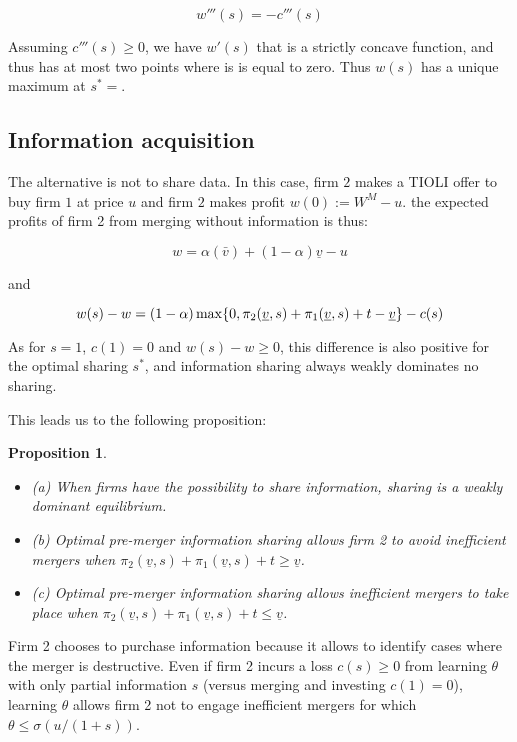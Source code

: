 \documentclass[a4paper,leqno]{article}%
\newtheorem{prop}{Proposition}
\renewcommand{\t}{\theta}
\renewcommand{\a}{\alpha}
\newcommand{\s}{\sigma}
\newcommand{\uv}{\underline v}
\newcommand{\ov}{\bar v}
\begin{document}
\[
w'''(s)=-c'''(s)
\]

Assuming $c'''(s)\geq 0$, we have $w'(s)$ that is a strictly concave function, and thus has at most two points where is is equal to zero. Thus $w(s)$ has a unique maximum at $s^*=$.

\medskip

\subsection{Information acquisition}

The alternative is not to share data. In this case, firm $2$ makes a TIOLI offer to buy firm $1$ at price $u$ and firm $2$ makes profit $w(0):=W^M-u$. the expected profits of firm 2 from merging without information is thus:

\[
w=\a(\ov)+(1-\a)\uv-u
\]

and 

\[
w(s)-w=(1-\a)\max\{0,\pi_2(\uv,s)+\pi_1(\uv,s)+t-\uv\}-c(s)\\
\]

As for $s=1$, $c(1)=0$ and $w(s)-w\geq0$, this difference is also positive for the optimal sharing $s^*$, and information sharing always weakly dominates no sharing.

\medskip

This leads us to the following proposition:

\begin{prop}~~\label{prop:1}

\begin{itemize}
    \item (a) When firms have the possibility to share information, sharing is a weakly dominant equilibrium.
    \item (b) Optimal pre-merger information sharing allows firm 2 to avoid inefficient mergers when $\pi_2(\uv,s)+\pi_1(\uv,s)+t\geq \uv$.
    \item (c) Optimal pre-merger information sharing allows inefficient mergers to take place when $\pi_2(\uv,s)+\pi_1(\uv,s)+t\leq \uv$.
\end{itemize} 

\end{prop}

\medskip

Firm 2 chooses to purchase information because it allows to identify cases where the merger is destructive. Even if firm 2 incurs a loss $c(s)\geq 0$ from learning $\t$ with only partial information $s$ (versus merging and investing $c(1)=0$), learning $\t$ allows firm 2 not to engage inefficient mergers for which $\t\leq \s(u/(1+s))$. 
\end{document}
